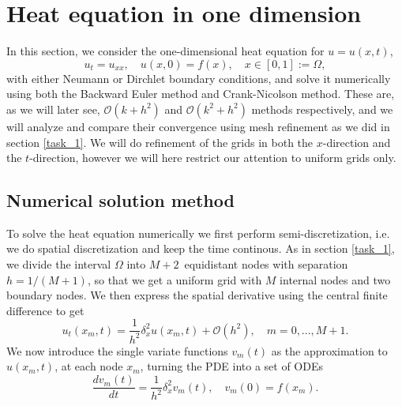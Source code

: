 \section{Heat equation in one dimension}
\label{heat-equation}
In this section, we consider the one-dimensional heat equation for $u = u(x, t)$, 
\begin{equation*}
    u_t = u_{xx}, \quad u(x, 0) = f(x), \quad x \in [0,1] := \Omega, 
    \label{eq:heat-eq}
\end{equation*}
with either Neumann or Dirchlet boundary conditions, 
and solve it numerically using both the Backward Euler method and Crank-Nicolson method. 
These are, 
as we will later see, 
$\mathcal{O}(k+h^2)$ and $\mathcal{O}(k^2+h^2)$ methods respectively, 
and we will analyze and compare their convergence using mesh refinement as we did in section \ref{task_1}. 
We will do refinement of the grids in both the $x$-direction and the $t$-direction, 
however we will here restrict our attention to uniform grids only. 

\subsection{Numerical solution method}
To solve the heat equation numerically we first perform semi-discretization, 
i.e. we do spatial discretization and keep the time continous. 
As in section \ref{task_1}, 
we divide the interval $\Omega$ into $M+2$ equidistant nodes with separation $h=1/(M+1)$, 
so that we get a uniform grid with $M$ internal nodes and two boundary nodes. 
We then express the spatial derivative using the central finite difference to get 
\begin{equation*}
    u_t(x_m, t) = \frac{1}{h^2} \delta_x^2 u(x_m, t) + \mathcal{O}(h^2), 
    \quad m = 0,...,M+1.
\end{equation*}
We now introduce the single variate functions $v_m(t)$ as the approximation to $u(x_m, t)$, 
at each node $x_m$, 
turning the PDE into a set of ODEs 
\begin{equation*}
    \frac{dv_m(t)}{dt} = \frac{1}{h^2} \delta_x^2 v_m(t), 
    \quad v_m(0) = f(x_m). 
\end{equation*}

